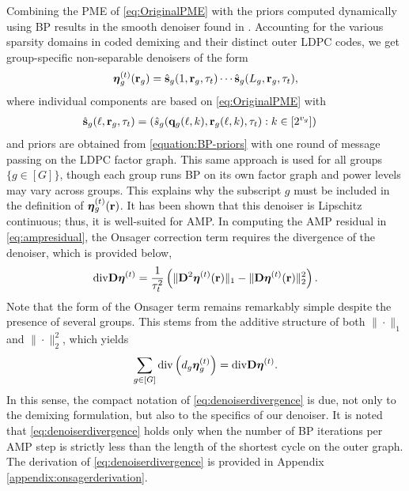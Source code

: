 \documentclass[journal]{IEEEtran}
\begin{document}
Combining the PME of \eqref{eq:OriginalPME} with the priors computed dynamically using BP results in the smooth denoiser found in \cite[Definition 6]{amalladinne2020unsourced}.
Accounting for the various sparsity domains in coded demixing and their distinct outer LDPC codes, we get group-specific non-separable denoisers of the form
\begin{equation}
    \label{eq:dynamicdenoiser}
    \boldsymbol{\eta}^{(t)}_{g}(\mathbf{r}_g) = \hat{\mathbf{s}}_{g}(1, \mathbf{r}_g, \tau_t)\cdots\hat{\mathbf{s}}_{g}(L_g, \mathbf{r}_g, \tau_t),
\end{equation}
where individual components are based on \eqref{eq:OriginalPME} with
\begin{equation*}
    \begin{split}
        &\hat{\sv}_{g}(\ell, \rv_g, \tau_t) = \left( \hat{s}_{g}(\qv_g(\ell, k), \rv_g(\ell, k), \tau_t) : k \in [2^{v_g}] \right) %
    \end{split}
\end{equation*}
and priors are obtained from \eqref{equation:BP-priors} with one round of message passing on the LDPC factor graph.
This same approach is used for all groups $\{g \in [G]\}$, though each group runs BP on its own factor graph and power levels may vary across groups.
This explains why the subscript $g$ must be included in the definition of $\boldsymbol{\eta}^{(t)}_g(\mathbf{r})$. 
It has been shown that this denoiser is Lipschitz continuous; thus, it is well-suited for AMP. 
In computing the AMP residual in \eqref{eq:ampresidual}, the Onsager correction term requires the divergence of the denoiser, which is provided below,
\begin{equation}
    \label{eq:denoiserdivergence}
    \mathrm{div}\mathbf{D}\boldsymbol{\eta}^{(t)} = \frac{1}{\tau_t^2}\left(
    \| \mathbf{D}^2\boldsymbol{\eta}^{(t)}(\mathbf{r}) \|_1 - \| \mathbf{D}\boldsymbol{\eta}^{(t)}(\mathbf{r}) \|_2^2 \right) .
\end{equation}
Note that the form of the Onsager term remains remarkably simple despite the presence of several groups.
This stems from the additive structure of both $\| \cdot \|_1$ and $\| \cdot \|_2^2$, which yields
\begin{equation*}
    \sum_{g \in [G]} \mathrm{div} \left( d_g \boldsymbol{\eta}_g^{(t)} \right)
    = \mathrm{div}\mathbf{D}\boldsymbol{\eta}^{(t)} .
\end{equation*}
In this sense, the compact notation of \eqref{eq:denoiserdivergence} is due, not only to the demixing formulation, but also to the specifics of our denoiser.
It is noted that \eqref{eq:denoiserdivergence} holds only when the number of BP iterations per AMP step is strictly less than the length of the shortest cycle on the outer graph. 
The derivation of \eqref{eq:denoiserdivergence} is provided in Appendix \ref{appendix:onsagerderivation}. 
\end{document}
